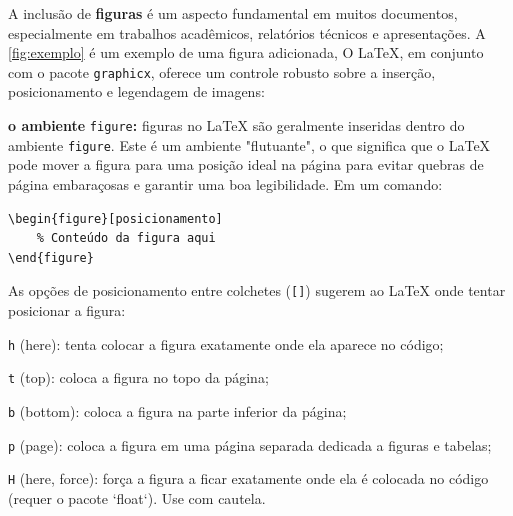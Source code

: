 A inclusão de \textbf{figuras} é um aspecto fundamental em muitos documentos, especialmente em trabalhos acadêmicos, relatórios técnicos e apresentações. A \autoref{fig:exemplo} é um exemplo de uma figura adicionada, O \LaTeX, em conjunto com o pacote \texttt{graphicx}, oferece um controle robusto sobre a inserção, posicionamento e legendagem de imagens:

\begin{alineas}
	\item \textbf{o ambiente} \texttt{figure}\textbf{:} figuras no LaTeX são geralmente inseridas dentro do ambiente \texttt{figure}. Este é um ambiente "flutuante", o que significa que o LaTeX pode mover a figura para uma posição ideal na página para evitar quebras de página embaraçosas e garantir uma boa legibilidade. Em um comando:
	\begin{lstlisting}[language={[LaTeX]TeX}]
\begin{figure}[posicionamento]
	% Conteúdo da figura aqui
\end{figure}
	\end{lstlisting}
	As opções de posicionamento entre colchetes (\texttt{[]}) sugerem ao LaTeX onde tentar posicionar a figura:
	\begin{alineas}
		\item \texttt{h} (here): tenta colocar a figura exatamente onde ela aparece no código;
		\item \texttt{t} (top): coloca a figura no topo da página;
		\item \texttt{b} (bottom): coloca a figura na parte inferior da página;
		\item \texttt{p} (page): coloca a figura em uma página separada dedicada a figuras e tabelas;
		\item \texttt{H} (here, force): força a figura a ficar exatamente onde ela é colocada no código (requer o pacote `float`). Use com cautela.
	\end{alineas}
	

\end{alineas}
